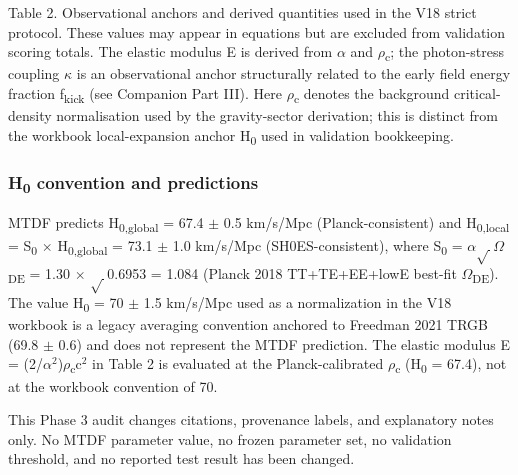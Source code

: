 \documentclass[11pt,a4paper]{article}
\begin{document}
Table 2. Observational anchors and derived quantities used in the V18 strict protocol. These values may appear in equations but are excluded from validation scoring totals. The elastic modulus E is derived from $\alpha$ and $\rho$\textsubscript{c}; the photon-stress coupling $\kappa$ is an observational anchor structurally related to the early field energy fraction f\textsubscript{kick} (see Companion Part III). Here $\rho$\textsubscript{c} denotes the background critical-density normalisation used by the gravity-sector derivation; this is distinct from the workbook local-expansion anchor H\textsubscript{0} used in validation bookkeeping.\begin{mdframed}[linecolor=accent,linewidth=0.5pt,backgroundcolor=callout-bg,leftline=true,rightline=true,topline=true,bottomline=true,innerleftmargin=8pt,innerrightmargin=8pt,innertopmargin=6pt,innerbottommargin=6pt]
\subsubsection{H\textsubscript{0} convention and predictions}
MTDF predicts H\textsubscript{0,global} = 67.4 $\pm$ 0.5 km/\allowbreak{}s/\allowbreak{}Mpc (Planck-consistent) and H\textsubscript{0,local} = S\textsubscript{0} $\times$ H\textsubscript{0,global} = 73.1 $\pm$ 1.0 km/\allowbreak{}s/\allowbreak{}Mpc (SH0ES-consistent), where S\textsubscript{0} = $\alpha$$\sqrt{\,}$$\Omega$\textsubscript{DE} = 1.30 $\times$ $\sqrt{\,}$0.6953 = 1.084 (Planck 2018 TT+TE+EE+lowE best-fit $\Omega$\textsubscript{DE}). The value H\textsubscript{0} = 70 $\pm$ 1.5 km/\allowbreak{}s/\allowbreak{}Mpc used as a normalization in the V18 workbook is a legacy averaging convention anchored to Freedman 2021 TRGB (69.8 $\pm$ 0.6) and does not represent the MTDF prediction. The elastic modulus E = (2/\allowbreak{}$\alpha$$^{2}$)$\rho$\textsubscript{c}c$^{2}$ in Table 2 is evaluated at the Planck-calibrated $\rho$\textsubscript{c} (H\textsubscript{0} = 67.4), not at the workbook convention of 70.
\end{mdframed}

This Phase 3 audit changes citations, provenance labels, and explanatory notes only. No MTDF parameter value, no frozen parameter set, no validation threshold, and no reported test result has been changed.
\end{document}
